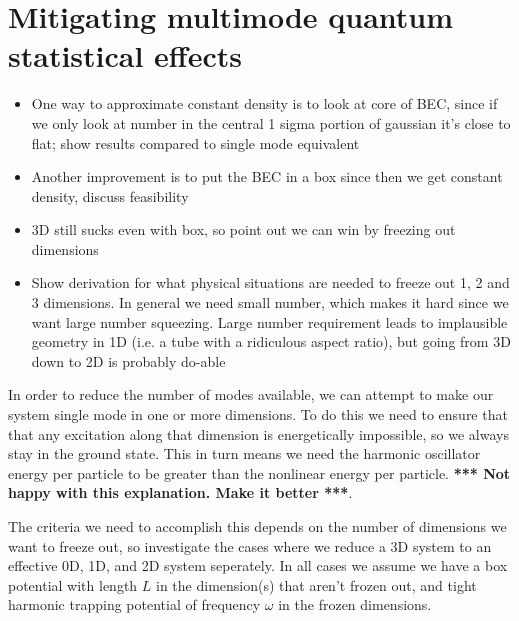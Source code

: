 \documentclass{iopart}
\begin{document}
\section{Mitigating multimode quantum statistical effects}
  \begin{itemize}
  \item One way to approximate constant density is to look at core of BEC, since if we only look at number in the central 1 sigma portion of gaussian it's close to flat; show results compared to single mode equivalent

  \item Another improvement is to put the BEC in a box since then we get constant density, discuss feasibility
  \item 3D still sucks even with box, so point out we can win by freezing out dimensions
  \item Show derivation for what physical situations are needed to freeze out 1, 2 and 3 dimensions. In general we need small number, which makes it hard since we want large number squeezing. Large number requirement leads to implausible geometry in 1D (i.e. a tube with a ridiculous aspect ratio), but going from 3D down to 2D is probably do-able
  \end{itemize}

In order to reduce the number of modes available, we can attempt to make our system single mode in one or more dimensions. To do this we need to ensure that that any excitation along that dimension is energetically impossible, so we always stay in the ground state. This in turn means we need the harmonic oscillator energy per particle to be greater than the nonlinear energy per particle. {\bf{*** Not happy with this explanation. Make it better ***}}.

The criteria we need to accomplish this depends on the number of dimensions we want to freeze out, so investigate the cases where we reduce a 3D system to an effective 0D, 1D, and 2D system seperately. In all cases we assume we have a box potential with length $L$ in the dimension(s) that aren't frozen out, and tight harmonic trapping potential of frequency $\omega$ in the frozen dimensions.
\end{document}
